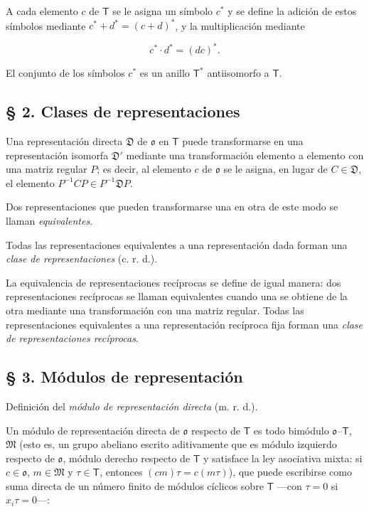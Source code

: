 A cada elemento $c$ de $\mathsf T$ se le asigna un símbolo $c^*$ y se define la adición de estos símbolos mediante $c^*+d^*=(c+d)^*$, y la multiplicación mediante

\[
c^*\cdot d^*=(dc)^*.
\]

El conjunto de los símbolos $c^*$ es un anillo $\mathsf T^*$ antiisomorfo a $\mathsf T$.

\subsection*{§ 2. Clases de representaciones}

Una representación directa $\mathfrak D$ de $\mathfrak{o}$ en $\mathsf T$ puede transformarse en una representación isomorfa $\mathfrak D'$ mediante una transformación elemento a elemento con una matriz regular $P$; es decir, al elemento $c$ de $\mathfrak{o}$ se le asigna, en lugar de $C\in\mathfrak D$, el elemento $P^{-1}CP\in P^{-1}\mathfrak D P$.

Dos representaciones que pueden transformarse una en otra de este modo se llaman \emph{equivalentes}.

Todas las representaciones equivalentes a una representación dada forman una \emph{clase de representaciones} (c. r. d.).

La equivalencia de representaciones recíprocas se define de igual manera: dos representaciones recíprocas se llaman equivalentes cuando una se obtiene de la otra mediante una transformación con una matriz regular. Todas las representaciones equivalentes a una representación recíproca fija forman una \emph{clase de representaciones recíprocas}.

\subsection*{§ 3. Módulos de representación}

Definición del \emph{módulo de representación directa} (m. r. d.).

Un módulo de representación directa de $\mathfrak{o}$ respecto de $\mathsf T$ es todo bimódulo $\mathfrak{o}$--$\mathsf T$, $\mathfrak M$ (esto es, un grupo abeliano escrito aditivamente que es módulo izquierdo respecto de $\mathfrak{o}$, módulo derecho respecto de $\mathsf T$ y satisface la ley asociativa mixta: si $c\in\mathfrak{o}$, $m\in\mathfrak M$ y $\tau\in\mathsf T$, entonces $(cm)\tau=c(m\tau)$), que puede escribirse como suma directa de un número finito de módulos cíclicos sobre $\mathsf T$ ---con $\tau=0$ si $x_i\tau=0$---:

